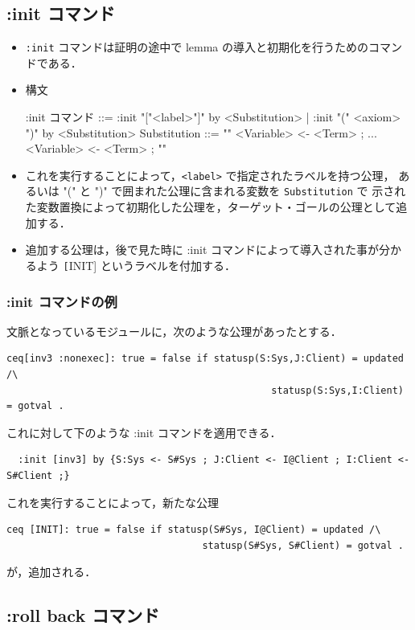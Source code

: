 \documentclass[a4paper,oneside,10pt,here]{memoir}
\newenvironment{vvtm}%
{\parskip=0pt\lineskip=0pt\begin{center}\begin{minipage}{0.8\textwidth}\begin{snugshade}}%
  {\end{snugshade}\end{minipage}\end{center}}
\begin{document}
\subsection{:init コマンド} 

\begin{itemize}
\item \verb|:init| コマンドは証明の途中で lemma の導入と初期化を行うためのコマンドである．
\item 構文
  \begin{vvtm}
    \begin{simplev}
 :init コマンド ::= :init "["<label>"]" by <Substitution>
                 |  :init "(" <axiom> ")" by <Substitution>
 Substitution ::= "{" <Variable> <- <Term> ; ... <Variable> <- <Term> ; "}"
    \end{simplev}
  \end{vvtm}
\item これを実行することによって，\verb|<label>| で指定されたラベルを持つ公理，
  あるいは "(" と ")" で囲まれた公理に含まれる変数を \verb|Substitution| で
  示された変数置換によって初期化した公理を，ターゲット・ゴールの公理として追加する．
\item 追加する公理は，後で見た時に :init コマンドによって導入された事が分かるよう
 \texttt[INIT] というラベルを付加する．
\end{itemize}

\subsubsection{:init コマンドの例}

文脈となっているモジュールに，次のような公理があったとする．
\begin{verbatim}
ceq[inv3 :nonexec]: true = false if statusp(S:Sys,J:Client) = updated /\ 
                                              statusp(S:Sys,I:Client) = gotval .
\end{verbatim}
これに対して下のような :init コマンドを適用できる．
\begin{verbatim}
  :init [inv3] by {S:Sys <- S#Sys ; J:Client <- I@Client ; I:Client <- S#Client ;}
\end{verbatim}
これを実行することによって，新たな公理
\begin{verbatim}
ceq [INIT]: true = false if statusp(S#Sys, I@Client) = updated /\
                                  statusp(S#Sys, S#Client) = gotval .
\end{verbatim}
が，追加される．

\subsection{:roll back コマンド}
\end{document}
